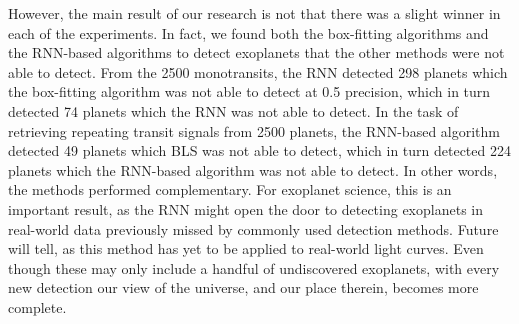 
However, the main result of our research is not that there was a slight winner in each of the experiments. In fact, we found both the box-fitting algorithms and the RNN-based algorithms to detect exoplanets that the other methods were not able to detect. From the 2500 monotransits, the RNN detected 298 planets which the box-fitting algorithm was not able to detect at 0.5 precision, which in turn detected 74 planets which the RNN was not able to detect. In the task of retrieving repeating transit signals from 2500 planets, the RNN-based algorithm detected 49 planets which BLS was not able to detect, which in turn detected 224 planets which the RNN-based algorithm was not able to detect. In other words, the methods performed complementary. For exoplanet science, this is an important result, as the RNN might open the door to detecting exoplanets in real-world data previously missed by commonly used detection methods. Future will tell, as this method has yet to be applied to real-world light curves. Even though these may only include a handful of undiscovered exoplanets, with every new detection our view of the universe, and our place therein, becomes more complete.